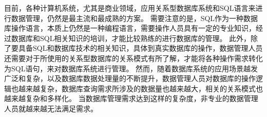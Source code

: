 



目前，各种计算机系统，尤其是商业领域，应用关系型数据库系统和SQL语言来进行数据管理，仍然是最主流和最成熟的方案。
需要注意的是，SQL作为一种数据库操作语言，本质上仍然是一种编程语言，需要操作人员具有一定的专业知识，经过数据库和SQL相关知识的培训，才能比较熟练的进行数据库的管理。
此外，除了要具备SQL和数据库技术的相关知识，具体到真实数据库的操作，数据管理人员还需要对于所使用的关系型数据库的关系模式有所了解，才能将各种操作需求转化为SQL语句，来对数据库系统进行管理。
然而，随着数据库系统的应用场景越发广泛和复杂，以及数据库数据处理量的不断提升，数据管理人员对数据库的操作逻辑也越来越复杂，数据库查询需求所涉及的数据量也越来越大，相关的关系模式也越来越复杂和多样化。
当数据库管理需求达到这样的复杂度，非专业的数据管理人员就越来越无法满足需求。

